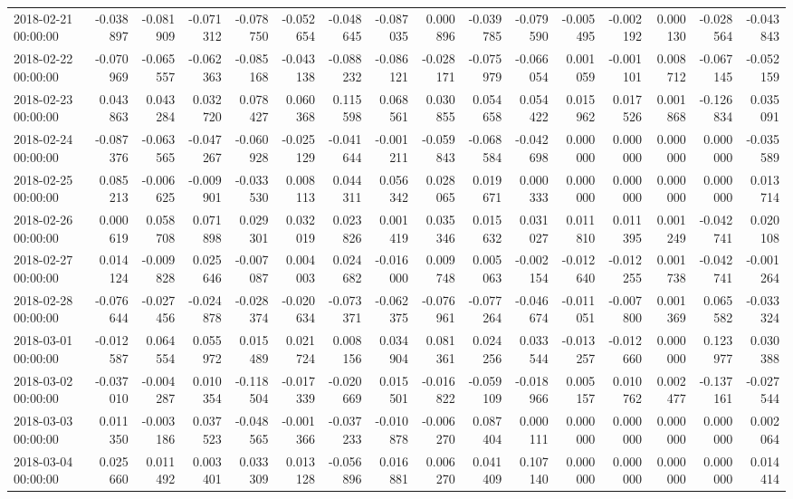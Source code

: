 \begin{tabular}{lrrrrrrrrrrrrrrr}
2018-02-21 00:00:00 & -0.038897 & -0.081909 & -0.071312 & -0.078750 & -0.052654 & -0.048645 & -0.087035 & 0.000896 & -0.039785 & -0.079590 & -0.005495 & -0.002192 & 0.000130 & -0.028564 & -0.043843 \\
2018-02-22 00:00:00 & -0.070969 & -0.065557 & -0.062363 & -0.085168 & -0.043138 & -0.088232 & -0.086121 & -0.028171 & -0.075979 & -0.066054 & 0.001059 & -0.001101 & 0.008712 & -0.067145 & -0.052159 \\
2018-02-23 00:00:00 & 0.043863 & 0.043284 & 0.032720 & 0.078427 & 0.060368 & 0.115598 & 0.068561 & 0.030855 & 0.054658 & 0.054422 & 0.015962 & 0.017526 & 0.001868 & -0.126834 & 0.035091 \\
2018-02-24 00:00:00 & -0.087376 & -0.063565 & -0.047267 & -0.060928 & -0.025129 & -0.041644 & -0.001211 & -0.059843 & -0.068584 & -0.042698 & 0.000000 & 0.000000 & 0.000000 & 0.000000 & -0.035589 \\
2018-02-25 00:00:00 & 0.085213 & -0.006625 & -0.009901 & -0.033530 & 0.008113 & 0.044311 & 0.056342 & 0.028065 & 0.019671 & 0.000333 & 0.000000 & 0.000000 & 0.000000 & 0.000000 & 0.013714 \\
2018-02-26 00:00:00 & 0.000619 & 0.058708 & 0.071898 & 0.029301 & 0.032019 & 0.023826 & 0.001419 & 0.035346 & 0.015632 & 0.031027 & 0.011810 & 0.011395 & 0.001249 & -0.042741 & 0.020108 \\
2018-02-27 00:00:00 & 0.014124 & -0.009828 & 0.025646 & -0.007087 & 0.004003 & 0.024682 & -0.016000 & 0.009748 & 0.005063 & -0.002154 & -0.012640 & -0.012255 & 0.001738 & -0.042741 & -0.001264 \\
2018-02-28 00:00:00 & -0.076644 & -0.027456 & -0.024878 & -0.028374 & -0.020634 & -0.073371 & -0.062375 & -0.076961 & -0.077264 & -0.046674 & -0.011051 & -0.007800 & 0.001369 & 0.065582 & -0.033324 \\
2018-03-01 00:00:00 & -0.012587 & 0.064554 & 0.055972 & 0.015489 & 0.021724 & 0.008156 & 0.034904 & 0.081361 & 0.024256 & 0.033544 & -0.013257 & -0.012660 & 0.000000 & 0.123977 & 0.030388 \\
2018-03-02 00:00:00 & -0.037010 & -0.004287 & 0.010354 & -0.118504 & -0.017339 & -0.020669 & 0.015501 & -0.016822 & -0.059109 & -0.018966 & 0.005157 & 0.010762 & 0.002477 & -0.137161 & -0.027544 \\
2018-03-03 00:00:00 & 0.011350 & -0.003186 & 0.037523 & -0.048565 & -0.001366 & -0.037233 & -0.010878 & -0.006270 & 0.087404 & 0.000111 & 0.000000 & 0.000000 & 0.000000 & 0.000000 & 0.002064 \\
2018-03-04 00:00:00 & 0.025660 & 0.011492 & 0.003401 & 0.033309 & 0.013128 & -0.056896 & 0.016881 & 0.006270 & 0.041409 & 0.107140 & 0.000000 & 0.000000 & 0.000000 & 0.000000 & 0.014414 \\

\end{tabular}
